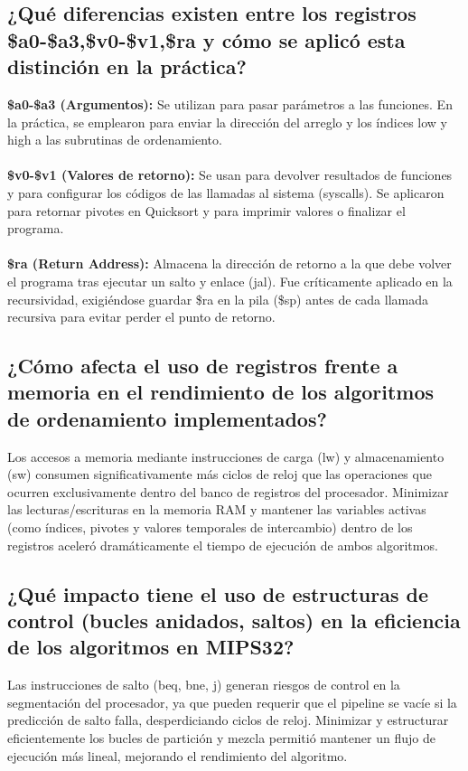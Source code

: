 \documentclass[12pt, a4paper]{article}
\begin{document}
\subsection{¿Qué diferencias existen entre los registros \$a0-\$a3,\$v0-\$v1,\$ra y cómo se aplicó esta distinción en la práctica?}
    \textbf{\$a0-\$a3 (Argumentos):} Se utilizan para pasar parámetros a las funciones. En la práctica, se emplearon para enviar la dirección del arreglo y los índices low y high a las subrutinas de ordenamiento.\\\\
    \textbf{\$v0-\$v1 (Valores de retorno):} Se usan para devolver resultados de funciones y para configurar los códigos de las llamadas al sistema (syscalls). Se aplicaron para retornar pivotes en Quicksort y para imprimir valores o finalizar el programa.\\\\
    \textbf{\$ra (Return Address):} Almacena la dirección de retorno a la que debe volver el programa tras ejecutar un salto y enlace (jal). Fue críticamente aplicado en la recursividad, exigiéndose guardar \$ra en la pila (\$sp) antes de cada llamada recursiva para evitar perder el punto de retorno.

\subsection{¿Cómo afecta el uso de registros frente a memoria en el rendimiento de los algoritmos de ordenamiento implementados?}
    Los accesos a memoria mediante instrucciones de carga (lw) y almacenamiento (sw) consumen significativamente más ciclos de reloj que las operaciones que ocurren exclusivamente dentro del banco de registros del procesador. Minimizar las lecturas/escrituras en la memoria RAM y mantener las variables activas (como índices, pivotes y valores temporales de intercambio) dentro de los registros aceleró dramáticamente el tiempo de ejecución de ambos algoritmos.

\subsection{ ¿Qué impacto tiene el uso de estructuras de control (bucles anidados, saltos) en la eficiencia de los algoritmos en MIPS32?}
    Las instrucciones de salto (beq, bne, j) generan riesgos de control en la segmentación del procesador, ya que pueden requerir que el pipeline se vacíe si la predicción de salto falla, desperdiciando ciclos de reloj. Minimizar y estructurar eficientemente los bucles de partición y mezcla permitió mantener un flujo de ejecución más lineal, mejorando el rendimiento del algoritmo.
\end{document}
